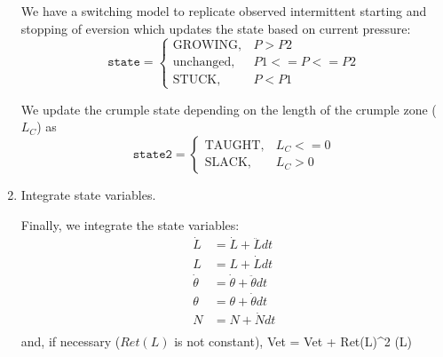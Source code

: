 \documentclass[letterpaper]{article}
\begin{document}
\begin{enumerate}
We have a switching model to replicate observed intermittent starting and stopping of eversion
which updates the state based on current pressure:
\begin{equation}
    \mathtt{state} =
    \begin{cases}
      \mathrm{GROWING}, &  P > P2 \\
      \mathrm{unchanged}, & P1 <= P <= P2 \\
      \mathrm{STUCK},   &  P < P1
    \end{cases}
\end{equation}

%
%


We update the crumple state depending on the length of the crumple
zone ($L_C$) as
\begin{equation}
    \mathtt{state2} =
    \begin{cases}
      \mathrm{TAUGHT},  &  L_C <=0 \\
      \mathrm{SLACK},   &  L_C  > 0
    \end{cases}
\end{equation}

\item Integrate state variables.

Finally, we integrate the state variables:
\begin{equation}
\begin{aligned}
  \dot{L} &= \dot{L} +  \ddot{L}  dt \\
  L       &= L + \dot{L}  dt \\
  \dot{\theta} &= \dot{\theta} + \ddot{\theta}dt \\
  \theta &= \theta + \dot{\theta} dt\\
  N &= N + \dot{N}  dt\\
\end{aligned}
\end{equation}
\noindent
and, if necessary ($Ret(L)$ is not constant),
\beq
Vet = Vet +  \pi Ret(L)^2  \; \dot(L)
\eeq

\end{enumerate}
\end{document}
